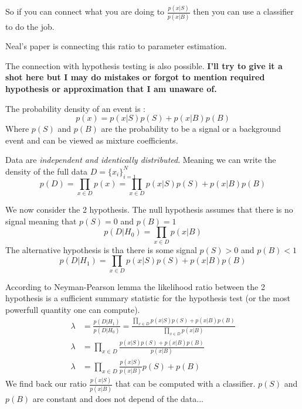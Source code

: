 So if you can connect what you are doing to $\frac{p(x|S)}{p(x|B)}$ then you can use a classifier to do the job.

Neal's paper \cite{Neal:2007zz} is connecting this ratio to parameter estimation.

The connection with hypothesis testing is also possible.
\textbf{I'll try to give it a shot here but I may do mistakes or forgot to mention required hypothesis or approximation that I am unaware of.}

The probability density of an event is :
\begin{equation}
 	p(x) = p(x|S) p(S) + p(x|B) p(B)
\end{equation} 
Where $p(S)$ and $p(B)$ are the probability to be a signal or a background event and can be viewed as mixture coefficients.

Data are \emph{independent and identically distributed}.
Meaning we can write the density of the full data $D = \{x_i\}_{i=1}^N$
\begin{equation}
	p(D) = \prod_{x\in D} p(x) = \prod_{x\in D} p(x|S) p(S) + p(x|B) p(B)
\end{equation}

We now consider the 2 hypothesis.
The null hypothesis assumes that there is no signal meaning that $p(S) = 0$ and $p(B) = 1$
\begin{equation}
	p(D |H_0) = \prod_{x\in D} p(x|B)
\end{equation}
The alternative hypothesis is tha there is some signal $p(S) > 0$ and $p(B) < 1$
\begin{equation}
	p(D | H_1) = \prod_{x\in D} p(x|S) p(S) + p(x|B) p(B)
\end{equation}

According to Neyman-Pearson lemma \cite{neyman_pearson_1933} the likelihood ratio between the 2 hypothesis is a sufficient summary statistic for the hypothesis test (or the most powerfull quantity one can compute).
\begin{align}
	\lambda & = \frac{p(D | H_1)}{p(D |H_0)} = \frac{\prod_{x\in D} p(x|S) p(S) + p(x|B) p(B)}{\prod_{x\in D} p(x|B)} \\
	\lambda & = \prod_{x\in D} \frac{ p(x|S) p(S) + p(x|B) p(B)}{p(x|B)} \\
	\lambda & = \prod_{x\in D}  \frac{p(x|S)}{p(x|B)}  p(S) + p(B)
\end{align}
We find back our ratio $\frac{p(x|S)}{p(x|B)}$ that can be computed with a classifier.
$p(S)$ and $p(B)$ are constant and does not depend of the data...

